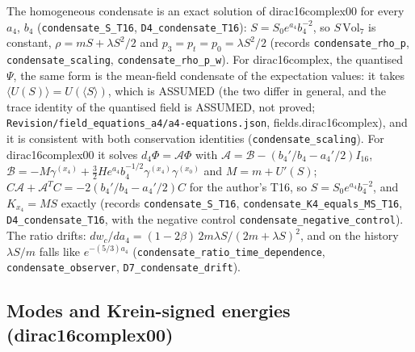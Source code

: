 \documentclass[11pt]{article}
\begin{document}
The homogeneous condensate is an exact solution of dirac16complex00 for every $a_4$, $b_4$ (\texttt{condensa\allowbreak{}te\_S\_T16}, \texttt{D4\_conde\allowbreak{}nsate\_T1\allowbreak{}6}): $S = S_0e^{a_4}b_4^{-2}$, so $S\,\mathrm{Vol}_7$ is constant, $\rho = mS + \lambda S^2/2$ and $p_3 = p_t = p_0 = \lambda S^2/2$ (records \texttt{condensa\allowbreak{}te\_rho\_p}, \texttt{condensa\allowbreak{}te\_scali\allowbreak{}ng}, \texttt{condensa\allowbreak{}te\_rho\_p\allowbreak{}\_w}). For dirac16complex, the quantised $\Psi$, the same form is the mean-field condensate of the expectation values: it takes $\langle U(S)\rangle = U(\langle S\rangle)$, which is ASSUMED (the two differ in general, and the trace identity of the quantised field is ASSUMED, not proved; \texttt{Revision\allowbreak{}/field\_e\allowbreak{}quations\allowbreak{}\_a4/a4-e\allowbreak{}quations\allowbreak{}.json}, fields.dirac16complex), and it is consistent with both conservation identities (\texttt{condensa\allowbreak{}te\_scali\allowbreak{}ng}). For dirac16complex00 it solves $d_4\Phi = \mathcal{A}\Phi$ with $\mathcal{A} = \mathcal{B} - (b_4'/b_4 - a_4'/2)I_{16}$, $\mathcal{B} = -M\gamma^{(x_4)} + \frac32He^{a_4}b_4^{-1/2}\gamma^{(x_4)}\gamma^{(x_0)}$ and $M = m + U'(S)$; $C\mathcal{A} + \mathcal{A}^TC = -2(b_4'/b_4 - a_4'/2)C$ for the author's T16, so $S = S_0e^{a_4}b_4^{-2}$, and $K_{x_4} = MS$ exactly (records \texttt{condensa\allowbreak{}te\_S\_T16}, \texttt{condensa\allowbreak{}te\_K4\_eq\allowbreak{}uals\_MS\_\allowbreak{}T16}, \texttt{D4\_conde\allowbreak{}nsate\_T1\allowbreak{}6}, with the negative control \texttt{condensa\allowbreak{}te\_negat\allowbreak{}ive\_cont\allowbreak{}rol}). The ratio drifts: $dw_c/da_4 = (1 - 2\beta)\,2m\lambda S/(2m + \lambda S)^2$, and on the history $\lambda S/m$ falls like $e^{-(5/3)a_4}$ (\texttt{condensa\allowbreak{}te\_ratio\allowbreak{}\_time\_de\allowbreak{}pendence}, \texttt{condensa\allowbreak{}te\_obser\allowbreak{}ver}, \texttt{D7\_conde\allowbreak{}nsate\_dr\allowbreak{}ift}).

\subsection{Modes and Krein-signed energies (dirac16complex00)}
\end{document}
